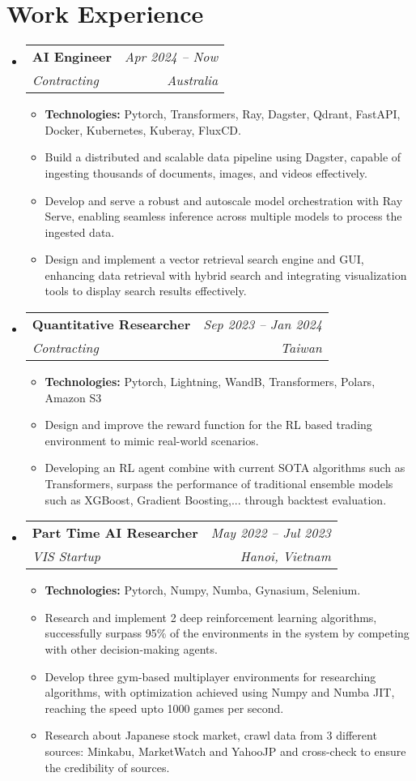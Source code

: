 \documentclass[letterpaper,11pt]{article}
\makeatletter
\newcommand{\resumeitem}[1]{
  \item \small{
    \hspace{1pt} #1 \vspace{-1pt}
  }
}
\newcommand{\resumeSubheading}[4]{
  \vspace{-1pt}\item
    \begin{tabular*}{0.97\textwidth}[t]{l@{\extracolsep{\fill}}r}
      \textbf{#1} & \textit{\small #2} \\
      \textit{\small #3} & \textit{\small #4} \\
    \end{tabular*}\vspace{-6pt}
}
\newcommand{\resumeSubHeadingListStart}{\begin{itemize}[leftmargin=*,label={}]}
\newcommand{\resumeSubHeadingListEnd}{\end{itemize}}
\newcommand{\resumeItemListStart}{\begin{itemize}}
\newcommand{\resumeItemListEnd}{\end{itemize}\vspace{-5pt}}
\makeatother
\begin{document}
\section{Work Experience}
  \resumeSubHeadingListStart
    \resumeSubheading
      {AI Engineer}{Apr 2024 -- Now}
      {Contracting}{Australia}
      \resumeItemListStart
        \resumeitem{\textbf{Technologies:} Pytorch, Transformers, Ray, Dagster, Qdrant, FastAPI, Docker, Kubernetes, Kuberay, FluxCD.}
        \resumeitem{Build a distributed and scalable data pipeline using Dagster, capable of ingesting thousands of documents, images, and videos effectively.}
        \resumeitem{Develop and serve a robust and autoscale model orchestration with Ray Serve, enabling seamless inference across multiple models to process the ingested data.}
        \resumeitem{Design and implement a vector retrieval search engine and GUI, enhancing data retrieval with hybrid search and integrating visualization tools to display search results effectively.}
      \resumeItemListEnd

    \resumeSubheading
      {Quantitative Researcher}{Sep 2023 -- Jan 2024}
      {Contracting}{Taiwan}
      \resumeItemListStart
        \resumeitem{\textbf{Technologies:} Pytorch, Lightning, WandB, Transformers, Polars, Amazon S3}
        \resumeitem{Design and improve the reward function for the RL based trading environment to mimic real-world scenarios.}
        \resumeitem{Developing an RL agent combine with current SOTA algorithms such as Transformers, surpass the performance of traditional ensemble models such as XGBoost, Gradient Boosting,... through backtest evaluation.}
      \resumeItemListEnd
      
    \resumeSubheading
      {Part Time AI Researcher}{May 2022 -- Jul 2023}
      {VIS Startup}{Hanoi, Vietnam}
      \resumeItemListStart
        \resumeitem{\textbf{Technologies:} Pytorch, Numpy, Numba, Gynasium, Selenium.}
        \resumeitem{Research and implement 2 deep reinforcement learning algorithms, successfully surpass 95\% of the environments in the system by competing with other decision-making agents.}
        \resumeitem{Develop three gym-based multiplayer environments for researching algorithms, with optimization achieved using Numpy and Numba JIT, reaching the speed upto 1000 games per second.}
        \resumeitem{Research about Japanese stock market, crawl data from 3 different sources: Minkabu, MarketWatch and YahooJP and cross-check to ensure the credibility of sources.}
      \resumeItemListEnd
  \resumeSubHeadingListEnd
\end{document}
